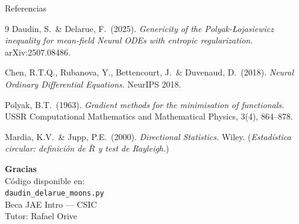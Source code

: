\documentclass[10pt]{beamer}
\begin{document}
\begin{frame}{Referencias}

\begin{thebibliography}{9}
  Daudin, S.\ \& Delarue, F.\ (2025).
  \textit{Genericity of the Polyak-Łojasiewicz inequality for mean-field Neural ODEs with entropic regularization.}
  arXiv:2507.08486.

  Chen, R.T.Q., Rubanova, Y., Bettencourt, J.\ \& Duvenaud, D.\ (2018).
  \textit{Neural Ordinary Differential Equations.}
  NeurIPS 2018.

  Polyak, B.T.\ (1963).
  \textit{Gradient methods for the minimisation of functionals.}
  USSR Computational Mathematics and Mathematical Physics, 3(4), 864--878.

  Mardia, K.V.\ \& Jupp, P.E.\ (2000).
  \textit{Directional Statistics.}
  Wiley.
  (\textit{Estadística circular: definición de $\bar{R}$ y test de Rayleigh.})
\end{thebibliography}

\end{frame}

\begin{frame}{}
  \begin{center}
    \Large\textbf{Gracias}\\[1em]
    \normalsize
    Código disponible en:\\
    \texttt{daudin\_delarue\_moons.py}\\[1em]
    Beca JAE Intro — CSIC\\
    Tutor: Rafael Orive
  \end{center}
\end{frame}
\end{document}
